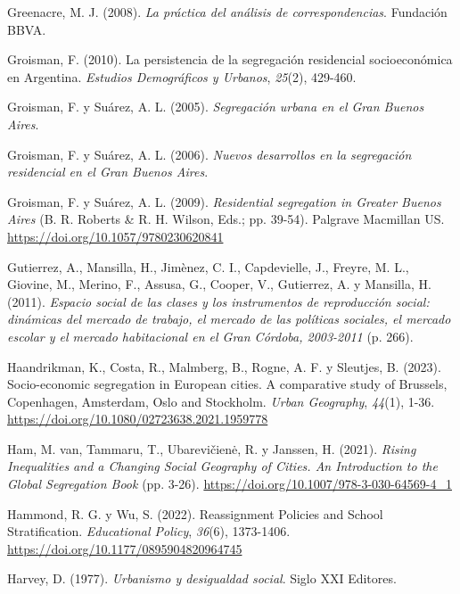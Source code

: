 \documentclass[
  spanish,
  a4paper,%
  chapterprefix=true,%
  DIV=calc,%
  twoside]{scrbook}%
\newlength{\cslhangindent}
\newenvironment{CSLReferences}[2] %
 {\begin{list}{}{%
  \setlength{\itemindent}{0pt}
  \setlength{\leftmargin}{0pt}
  \setlength{\parsep}{0pt}
  \ifodd #1
   \setlength{\leftmargin}{\cslhangindent}
   \setlength{\itemindent}{-1\cslhangindent}
  \fi
  \setlength{\itemsep}{#2\baselineskip}}}
 {\end{list}}
\begin{document}
\begin{CSLReferences}{1}{0}
Greenacre, M. J. (2008). \emph{La práctica del análisis de correspondencias}. Fundación BBVA.

Groisman, F. (2010). La persistencia de la segregación residencial socioeconómica en Argentina. \emph{Estudios Demográficos y Urbanos}, \emph{25}(2), 429-460.

Groisman, F. y Suárez, A. L. (2005). \emph{Segregación urbana en el {Gran} {Buenos} {Aires}}.

Groisman, F. y Suárez, A. L. (2006). \emph{Nuevos desarrollos en la segregación residencial en el {Gran} {Buenos} {Aires}}.

Groisman, F. y Suárez, A. L. (2009). \emph{Residential segregation in Greater Buenos Aires} (B. R. Roberts \& R. H. Wilson, Eds.; pp. 39-54). Palgrave Macmillan US. \url{https://doi.org/10.1057/9780230620841}

Gutierrez, A., Mansilla, H., Jimènez, C. I., Capdevielle, J., Freyre, M. L., Giovine, M., Merino, F., Assusa, G., Cooper, V., Gutierrez, A. y Mansilla, H. (2011). \emph{Espacio social de las clases y los instrumentos de reproducción social: dinámicas del mercado de trabajo, el mercado de las políticas sociales, el mercado escolar y el mercado habitacional en el Gran Córdoba, 2003-2011} (p. 266).

Haandrikman, K., Costa, R., Malmberg, B., Rogne, A. F. y Sleutjes, B. (2023). Socio-economic segregation in European cities. A comparative study of Brussels, Copenhagen, Amsterdam, Oslo and Stockholm. \emph{Urban Geography}, \emph{44}(1), 1-36. \url{https://doi.org/10.1080/02723638.2021.1959778}

Ham, M. van, Tammaru, T., Ubarevičienė, R. y Janssen, H. (2021). \emph{Rising Inequalities and a Changing Social Geography of Cities. An Introduction to the Global Segregation Book} (pp. 3-26). \url{https://doi.org/10.1007/978-3-030-64569-4_1}

Hammond, R. G. y Wu, S. (2022). Reassignment Policies and School Stratification. \emph{Educational Policy}, \emph{36}(6), 1373-1406. \url{https://doi.org/10.1177/0895904820964745}

Harvey, D. (1977). \emph{Urbanismo y desigualdad social}. Siglo XXI Editores.


\end{CSLReferences}
\end{document}
